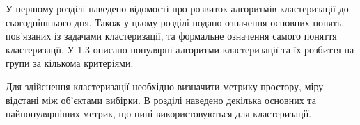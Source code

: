     У першому розділі наведено відомості про розвиток алгоритмів кластеризації до сьогоднішнього дня. Також у цьому розділі подано означення основних понять, пов’язаних із задачами кластеризації, та формальне означення самого поняття кластеризації. У 1.3 описано популярні алгоритми кластеризації та їх розбиття на групи за кількома критеріями.
    
    Для здійснення кластеризації необхідно визначити метрику простору, міру відстані між об’єктами вибірки. В розділі наведено декілька основних та найпопулярніших метрик, що нині використовуються для кластеризації.
